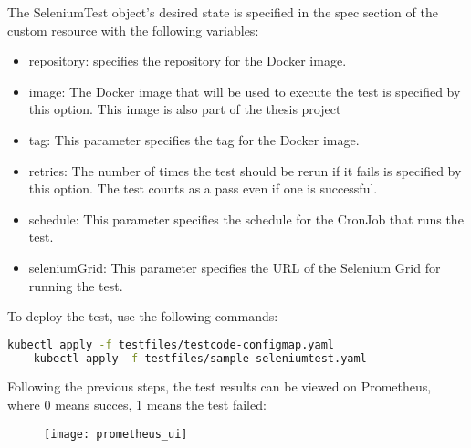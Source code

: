 The SeleniumTest object's desired state is specified in the spec section of the custom resource with the following variables:

\begin{itemize}
	\item repository: specifies the repository for the Docker image.
	\item image: The Docker image that will be used to execute the test is specified by this option. This image is also part of the thesis project
	\item tag: This parameter specifies the tag for the Docker image.
	\item retries: The number of times the test should be rerun if it fails is specified by this option. The test counts as a pass even if one is successful.
	\item schedule: This parameter specifies the schedule for the CronJob that runs the test.
	\item seleniumGrid: This parameter specifies the URL of the Selenium Grid for running the test.
\end{itemize}

To deploy the test, use the following commands:
\begin{lstlisting}[language=bash]
	kubectl apply -f testfiles/testcode-configmap.yaml
	kubectl apply -f testfiles/sample-seleniumtest.yaml
\end{lstlisting}

Following the previous steps, the test results can be viewed on Prometheus, where 0 means succes, 1 means the test failed:
\begin{figure}[H]
	\centering
	\texttt{[image: prometheus\_ui]}
	\label{fig:prometheus_ui}
\end{figure}